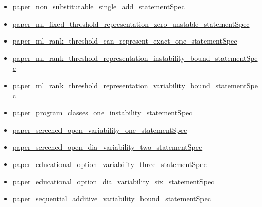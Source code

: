 \documentclass[10pt]{article}
\begin{document}
\begin{itemize}[leftmargin=1.2em]
\begin{itemize}[leftmargin=1.2em]
\item \hyperlink{source-claim-ca2a099855204aca}{paper\_\allowbreak{}non\_\allowbreak{}substitutable\_\allowbreak{}single\_\allowbreak{}add\_\allowbreak{}statement\allowbreak{}Spec}
\item \hyperlink{source-claim-bc7eeffb236e6569}{paper\_\allowbreak{}ml\_\allowbreak{}fixed\_\allowbreak{}threshold\_\allowbreak{}representation\_\allowbreak{}zero\_\allowbreak{}unstable\_\allowbreak{}statement\allowbreak{}Spec}
\item \hyperlink{source-claim-d21050cec8d233b0}{paper\_\allowbreak{}ml\_\allowbreak{}rank\_\allowbreak{}threshold\_\allowbreak{}can\_\allowbreak{}represent\_\allowbreak{}exact\_\allowbreak{}one\_\allowbreak{}statement\allowbreak{}Spec}
\item \hyperlink{source-claim-47a9f492a25c4e98}{paper\_\allowbreak{}ml\_\allowbreak{}rank\_\allowbreak{}threshold\_\allowbreak{}representation\_\allowbreak{}instability\_\allowbreak{}bound\_\allowbreak{}statement\allowbreak{}Spec}
\item \hyperlink{source-claim-98ed151e7543b81d}{paper\_\allowbreak{}ml\_\allowbreak{}rank\_\allowbreak{}threshold\_\allowbreak{}representation\_\allowbreak{}variability\_\allowbreak{}bound\_\allowbreak{}statement\allowbreak{}Spec}
\item \hyperlink{source-claim-396063f8f4209701}{paper\_\allowbreak{}program\_\allowbreak{}classes\_\allowbreak{}one\_\allowbreak{}instability\_\allowbreak{}statement\allowbreak{}Spec}
\item \hyperlink{source-claim-f595f3e6af0e1b40}{paper\_\allowbreak{}screened\_\allowbreak{}open\_\allowbreak{}variability\_\allowbreak{}one\_\allowbreak{}statement\allowbreak{}Spec}
\item \hyperlink{source-claim-8afe5dc5804dcb73}{paper\_\allowbreak{}screened\_\allowbreak{}open\_\allowbreak{}dia\_\allowbreak{}variability\_\allowbreak{}two\_\allowbreak{}statement\allowbreak{}Spec}
\item \hyperlink{source-claim-68c8be83630deedf}{paper\_\allowbreak{}educational\_\allowbreak{}option\_\allowbreak{}variability\_\allowbreak{}three\_\allowbreak{}statement\allowbreak{}Spec}
\item \hyperlink{source-claim-a241fbe5321a55d3}{paper\_\allowbreak{}educational\_\allowbreak{}option\_\allowbreak{}dia\_\allowbreak{}variability\_\allowbreak{}six\_\allowbreak{}statement\allowbreak{}Spec}
\item \hyperlink{source-claim-207dcf4700d4343b}{paper\_\allowbreak{}sequential\_\allowbreak{}additive\_\allowbreak{}variability\_\allowbreak{}bound\_\allowbreak{}statement\allowbreak{}Spec}

\end{itemize}
\end{itemize}
\end{document}
